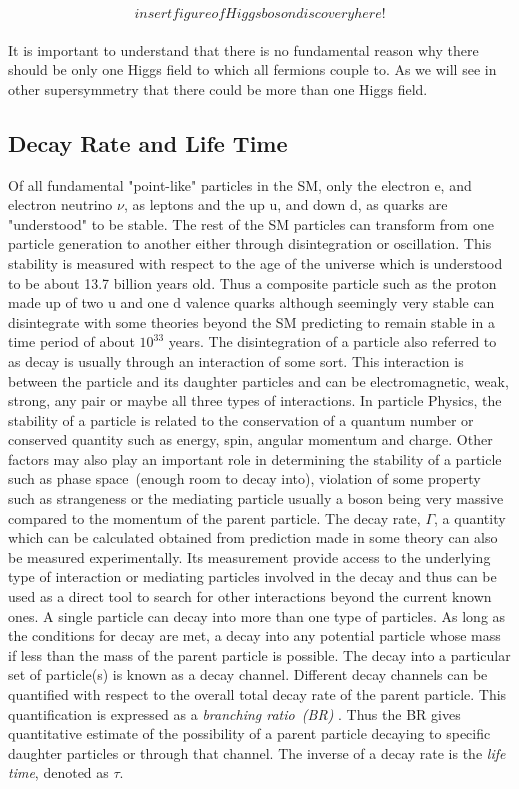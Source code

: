 \begin{equation}
insert figure of Higgs boson discovery here!
\end{equation}

\paragraph*{}
It is important to understand that there is no fundamental reason why there should be only one Higgs field to which all fermions couple to. As we will see in other supersymmetry that there could be more than one Higgs field.

\subsection{Decay Rate and Life Time}
Of all fundamental "point-like" particles in the SM, only the electron e, and electron neutrino $\nu$, as leptons and the up u, and down d, as quarks are "understood" to be stable. The rest of the SM particles can transform from one particle generation to another either through disintegration or oscillation. This stability is measured with respect to the age of the universe which is understood to be about 13.7 billion years old. Thus a composite particle such as the proton made up of two u and one d valence quarks although seemingly very stable can disintegrate with some theories beyond the SM  predicting to remain stable in a time period of about $10^{33}$ years.
The disintegration of a particle also referred to as decay is usually through an interaction of some sort. This interaction is between the particle and its daughter particles and can be electromagnetic, weak, strong, any pair or maybe all three types of interactions. 
In particle Physics, the stability of a particle is related to the conservation of a quantum number or conserved quantity such as energy, spin, angular momentum and charge. Other factors may also play an important role in determining the stability of a particle  such as phase space~(enough room to decay into), violation of some property such as strangeness or the mediating particle usually a boson being very massive compared to the momentum of the parent particle. 
The decay rate, $\Gamma$, a quantity which can be calculated obtained from prediction made in some theory can also be measured experimentally. Its measurement provide access to the underlying type of interaction or mediating particles involved in the decay and thus can be used as a direct tool to search for other interactions beyond the current known ones. 
A single particle can decay into more than one type of particles. As long as the conditions for decay are met, a decay into any potential particle whose mass if less than the mass of the parent particle is possible. The decay into a particular set of particle(s) is known as a decay channel. Different decay channels can be quantified with respect to the overall total decay rate  of the parent particle. This quantification is expressed as a \textit{ branching ratio~(BR) }. Thus the BR gives quantitative estimate of the possibility of a parent particle decaying to specific daughter particles or through that channel.
\newline
The inverse of a decay rate is the \textit{life time}, denoted as $\tau$.

